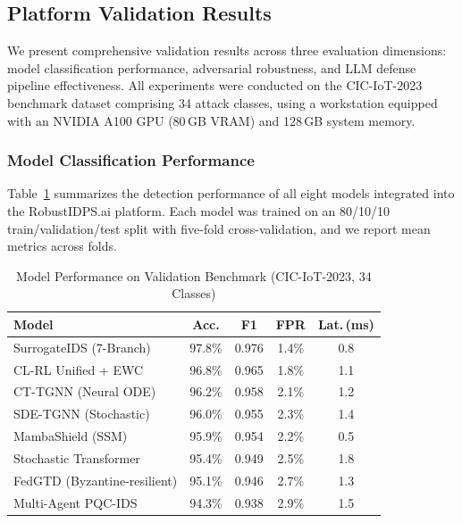 
\subsection{Platform Validation Results}
\label{subsec:platform-validation-results}

We present comprehensive validation results across three evaluation dimensions:
model classification performance, adversarial robustness, and LLM defense
pipeline effectiveness. All experiments were conducted on the CIC-IoT-2023
benchmark dataset comprising 34 attack classes, using a workstation equipped
with an NVIDIA A100 GPU (80\,GB VRAM) and 128\,GB system memory.

\subsubsection{Model Classification Performance}

Table~\ref{tab:model-performance} summarizes the detection performance of
all eight models integrated into the RobustIDPS.ai platform. Each model was
trained on an 80/10/10 train/validation/test split with five-fold
cross-validation, and we report mean metrics across folds.

\begin{table}[!htbp]
\centering
\caption{Model Performance on Validation Benchmark (CIC-IoT-2023, 34 Classes)}
\label{tab:model-performance}
\renewcommand{\arraystretch}{1.15}
\begin{tabular}{@{}lcccc@{}}
\toprule
\textbf{Model} & \textbf{Acc.} & \textbf{F1} & \textbf{FPR} & \textbf{Lat.\,(ms)} \\
\midrule
SurrogateIDS (7-Branch)      & 97.8\% & 0.976 & 1.4\% & 0.8 \\
CL-RL Unified + EWC          & 96.8\% & 0.965 & 1.8\% & 1.1 \\
CT-TGNN (Neural ODE)         & 96.2\% & 0.958 & 2.1\% & 1.2 \\
SDE-TGNN (Stochastic)        & 96.0\% & 0.955 & 2.3\% & 1.4 \\
MambaShield (SSM)             & 95.9\% & 0.954 & 2.2\% & 0.5 \\
Stochastic Transformer        & 95.4\% & 0.949 & 2.5\% & 1.8 \\
FedGTD (Byzantine-resilient)  & 95.1\% & 0.946 & 2.7\% & 1.3 \\
Multi-Agent PQC-IDS           & 94.3\% & 0.938 & 2.9\% & 1.5 \\
\bottomrule
\end{tabular}
\end{table}

